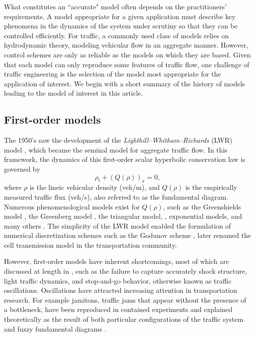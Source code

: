 \documentclass[preprint]{elsarticle}
\begin{document}
What constitutes an ``accurate" model often depends on the practitioners' requirements. A model appropriate for a given application must describe key phenomena in the dynamics of the system under scrutiny so that they can be controlled efficiently. For traffic, a commonly used class of models relies on hydrodynamic theory, modeling vehicular flow in an aggregate manner. However, control schemes are only as reliable as the models on which they are based. Given that each model can only reproduce some features of traffic flow, one challenge of traffic engineering is the selection of the model most appropriate for the application of interest. We begin with a short summary of the history of models leading to the model of interest in this article.

\subsection{First-order models}
The 1950's saw the development of the \textit{Lighthill--Whitham--Richards}
(LWR) model \cite{LW,Richards}, which became the seminal model for aggregate
traffic flow. In this framework, the dynamics of this first-order scalar hyperbolic conservation law is governed by
\begin{equation}
\rho_t+\left(Q\left(\rho\right)\right)_x=0,
\end{equation}
where $\rho$ is the lineic vehicular density (veh/m), and $Q(\rho)$ is the empirically measured traffic flux (veh/s), also referred to as the fundamental diagram. Numerous phenomenological models exist for $Q(\rho)$,  such as the Greenshields model \cite{Greenshieldsflux}, the Greenberg model \cite{Greenbergflux}, the triangular model, \cite{Newell1993, daganzo1994cell}, exponential models, \cite{Wang2005141, Papageorgiou198929, Flynn09self-sustainednonlinear} and many others \cite{treiber2013traffic, garavello2006trafficbook}. The simplicity of the LWR model enabled the formulation of numerical discretization
schemes such as the Godunov scheme \cite{godunov,Osher}, later renamed the cell transmission
model \cite{daganzo1994cell,daganzo1995cell} in the transportation community. 

However, first-order models have inherent shortcomings, most of which are discussed at length in \cite{Dag_requiem}, such as the failure to capture accurately shock structure, light traffic dynamics, and stop-and-go behavior, otherwise known as traffic oscillations. Oscillations have attracted increasing attention in transportation research. For example jamitons, traffic jams that appear without the presence of a bottleneck, have been reproduced in contained experiments \cite{Jamitons2008,Flynn08onjamitons} and explained theoretically
as the result of both particular configurations of the traffic system
\cite{Flynn09self-sustainednonlinear} and
fuzzy fundamental diagrams \cite{Jamitons-multi-valued-fund}. 
\end{document}
